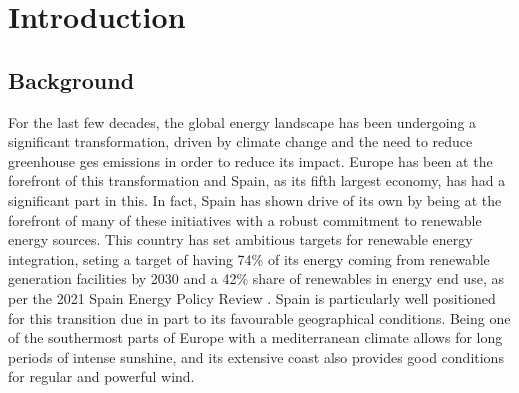 \section{Introduction}
\subsection{Background}

For the last few decades, the global energy landscape has been undergoing a significant transformation, driven by climate change and the need to reduce greenhouse ges emissions in order to reduce its impact. Europe has been at the forefront of this transformation and Spain, as its fifth largest economy, has had a significant part in this. In fact, Spain has shown drive of its own by being at the forefront of many of these initiatives with a robust commitment to renewable energy sources. This country has set ambitious targets for renewable energy integration, seting a target of having 74\% of its energy coming from renewable generation facilities by 2030 and a 42\% share of renewables in energy end use, as per the 2021 Spain Energy Policy Review \cite{energy_policy_review_spain_2021}. Spain is particularly well positioned for this transition due in part to its favourable geographical conditions. Being one of the southermost parts of Europe with a mediterranean climate allows for long periods of intense sunshine, and its extensive coast also provides good conditions for regular and powerful wind. 

